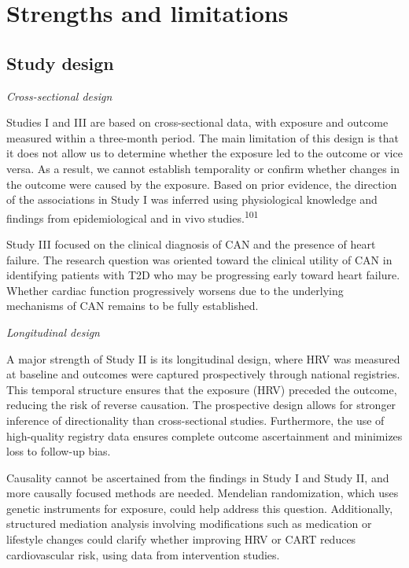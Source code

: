 \documentclass[
  letterpaper,
  headsepline=true,
  open=any]{scrbook}
\begin{document}
\hypertarget{strengths-and-limitations}{%
\section{Strengths and limitations}\label{strengths-and-limitations}}

\hypertarget{study-design}{%
\subsection{Study design}\label{study-design}}

\emph{Cross-sectional design}

Studies I and III are based on cross-sectional data, with exposure and
outcome measured within a three-month period. The main limitation of
this design is that it does not allow us to determine whether the
exposure led to the outcome or vice versa. As a result, we cannot
establish temporality or confirm whether changes in the outcome were
caused by the exposure. Based on prior evidence, the direction of the
associations in Study I was inferred using physiological knowledge and
findings from epidemiological and in vivo studies.\textsuperscript{101}

Study III focused on the clinical diagnosis of CAN and the presence of
heart failure. The research question was oriented toward the clinical
utility of CAN in identifying patients with T2D who may be progressing
early toward heart failure. Whether cardiac function progressively
worsens due to the underlying mechanisms of CAN remains to be fully
established.

\emph{Longitudinal design}

A major strength of Study II is its longitudinal design, where HRV was
measured at baseline and outcomes were captured prospectively through
national registries. This temporal structure ensures that the exposure
(HRV) preceded the outcome, reducing the risk of reverse causation. The
prospective design allows for stronger inference of directionality than
cross-sectional studies. Furthermore, the use of high-quality registry
data ensures complete outcome ascertainment and minimizes loss to
follow-up bias.

Causality cannot be ascertained from the findings in Study I and Study
II, and more causally focused methods are needed. Mendelian
randomization, which uses genetic instruments for exposure, could help
address this question. Additionally, structured mediation analysis
involving modifications such as medication or lifestyle changes could
clarify whether improving HRV or CART reduces cardiovascular risk, using
data from intervention studies.
\end{document}
